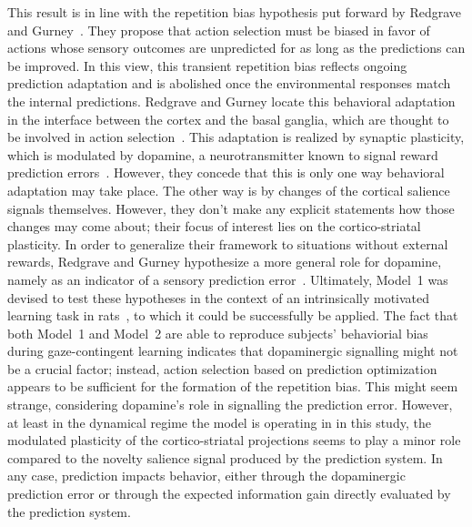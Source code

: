 \documentclass[a4paper]{scrreprt}
\begin{document}
This result is in line with the repetition bias hypothesis put forward by Redgrave and Gurney~\cite{redgrave06}. They propose that action selection must be biased in favor of actions whose sensory outcomes are unpredicted for as long as the predictions can be improved. In this view, this transient repetition bias reflects ongoing prediction adaptation and is abolished once the environmental responses match the internal predictions. Redgrave and Gurney locate this behavioral adaptation in the interface between the cortex and the basal ganglia, which are thought to be involved in action selection~\cite{mink93,doya99,redgrave99,houk07}. This adaptation is realized by synaptic plasticity, which is modulated by dopamine, a neurotransmitter known to signal reward prediction errors~\cite{schultz97}. However, they concede that this is only one way behavioral adaptation may take place. The other way is by changes of the cortical salience signals themselves. However, they don't make any explicit statements how those changes may come about; their focus of interest lies on the cortico-striatal plasticity. In order to generalize their framework to situations without external rewards, Redgrave and Gurney hypothesize a more general role for dopamine, namely as an indicator of a sensory prediction error~\cite{gurney13}. Ultimately, Model~1 was devised to test these hypotheses in the context of an intrinsically motivated learning task in rats~\cite{bg13}, to which it could be successfully be applied. The fact that both Model~1 and Model~2 are able to reproduce subjects' behaviorial bias during gaze-contingent learning indicates that dopaminergic signalling might not be a crucial factor; instead, action selection based on prediction optimization appears to be sufficient for the formation of the repetition bias. This might seem strange, considering dopamine's role in signalling the prediction error. However, at least in the dynamical regime the model is operating in in this study, the modulated plasticity of the cortico-striatal projections seems to play a minor role compared to the novelty salience signal produced by the prediction system. In any case, prediction impacts behavior, either through the dopaminergic prediction error or through the expected information gain directly evaluated by the prediction system.
\end{document}

